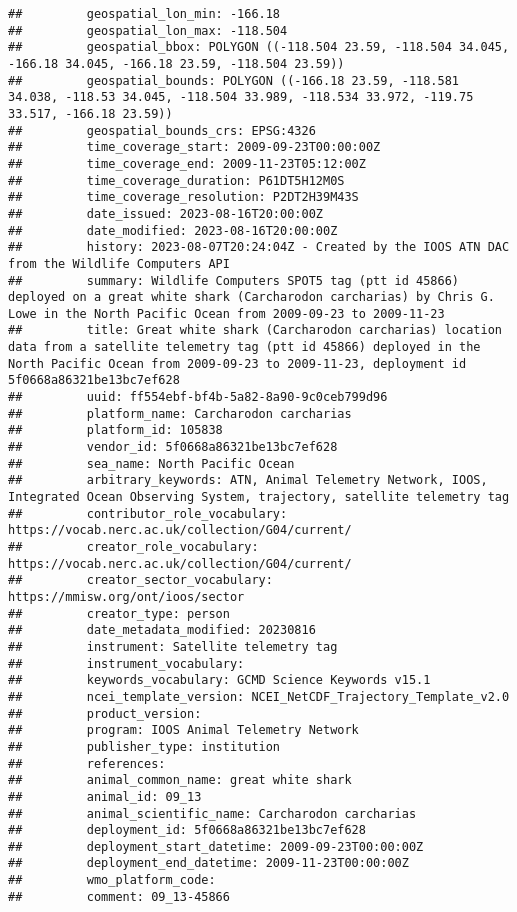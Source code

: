 \documentclass[
]{book}
\begin{document}
\begin{verbatim}
##         geospatial_lon_min: -166.18
##         geospatial_lon_max: -118.504
##         geospatial_bbox: POLYGON ((-118.504 23.59, -118.504 34.045, -166.18 34.045, -166.18 23.59, -118.504 23.59))
##         geospatial_bounds: POLYGON ((-166.18 23.59, -118.581 34.038, -118.53 34.045, -118.504 33.989, -118.534 33.972, -119.75 33.517, -166.18 23.59))
##         geospatial_bounds_crs: EPSG:4326
##         time_coverage_start: 2009-09-23T00:00:00Z
##         time_coverage_end: 2009-11-23T05:12:00Z
##         time_coverage_duration: P61DT5H12M0S
##         time_coverage_resolution: P2DT2H39M43S
##         date_issued: 2023-08-16T20:00:00Z
##         date_modified: 2023-08-16T20:00:00Z
##         history: 2023-08-07T20:24:04Z - Created by the IOOS ATN DAC from the Wildlife Computers API
##         summary: Wildlife Computers SPOT5 tag (ptt id 45866) deployed on a great white shark (Carcharodon carcharias) by Chris G. Lowe in the North Pacific Ocean from 2009-09-23 to 2009-11-23
##         title: Great white shark (Carcharodon carcharias) location data from a satellite telemetry tag (ptt id 45866) deployed in the North Pacific Ocean from 2009-09-23 to 2009-11-23, deployment id 5f0668a86321be13bc7ef628
##         uuid: ff554ebf-bf4b-5a82-8a90-9c0ceb799d96
##         platform_name: Carcharodon carcharias
##         platform_id: 105838
##         vendor_id: 5f0668a86321be13bc7ef628
##         sea_name: North Pacific Ocean
##         arbitrary_keywords: ATN, Animal Telemetry Network, IOOS, Integrated Ocean Observing System, trajectory, satellite telemetry tag
##         contributor_role_vocabulary: https://vocab.nerc.ac.uk/collection/G04/current/
##         creator_role_vocabulary: https://vocab.nerc.ac.uk/collection/G04/current/
##         creator_sector_vocabulary: https://mmisw.org/ont/ioos/sector
##         creator_type: person
##         date_metadata_modified: 20230816
##         instrument: Satellite telemetry tag
##         instrument_vocabulary: 
##         keywords_vocabulary: GCMD Science Keywords v15.1
##         ncei_template_version: NCEI_NetCDF_Trajectory_Template_v2.0
##         product_version: 
##         program: IOOS Animal Telemetry Network
##         publisher_type: institution
##         references: 
##         animal_common_name: great white shark
##         animal_id: 09_13
##         animal_scientific_name: Carcharodon carcharias
##         deployment_id: 5f0668a86321be13bc7ef628
##         deployment_start_datetime: 2009-09-23T00:00:00Z
##         deployment_end_datetime: 2009-11-23T00:00:00Z
##         wmo_platform_code: 
##         comment: 09_13-45866

\end{verbatim}
\end{document}

